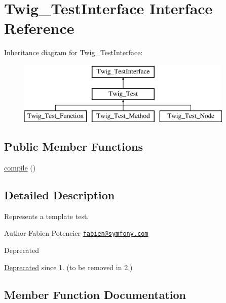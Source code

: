 \hypertarget{interfaceTwig__TestInterface}{}\section{Twig\+\_\+\+Test\+Interface Interface Reference}
\label{interfaceTwig__TestInterface}
Inheritance diagram for Twig\+\_\+\+Test\+Interface\+:\begin{figure}[H]
\begin{center}
\leavevmode
\includegraphics[height=3.000000cm]{interfaceTwig__TestInterface}
\end{center}
\end{figure}
\subsection*{Public Member Functions}
\begin{DoxyCompactItemize}
\item 
\hyperlink{interfaceTwig__TestInterface_ae364583be8198a04a7fe292f1c3d3033}{compile} ()
\end{DoxyCompactItemize}


\subsection{Detailed Description}
Represents a template test.

\begin{DoxyAuthor}{Author}
Fabien Potencier \href{mailto:fabien@symfony.com}{\tt fabien@symfony.\+com}
\end{DoxyAuthor}
\begin{DoxyRefDesc}{Deprecated}
\item[\hyperlink{deprecated__deprecated000042}{Deprecated}]since 1. (to be removed in 2.) \end{DoxyRefDesc}


\subsection{Member Function Documentation}
